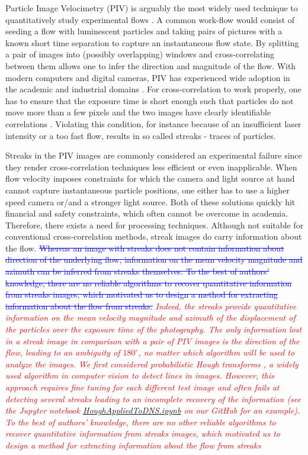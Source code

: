 \documentclass{svjour3}                     %
\newcommand{\new}[1]{\textit{\textcolor{red}{#1}}}
\newcommand{\old}[1]{\textcolor{blue}{\sout{#1}}}
\begin{document}
Particle Image Velocimetry (PIV) is arguably the most widely used technique to quantitatively study experimental flows \cite{westerweel1997fundamentals, raffel2018particle}. A common work-flow would consist of seeding a flow with luminescent particles and taking pairs of pictures with a known short time separation to capture an instantaneous flow state. By splitting a pair of images into (possibly overlapping) windows and cross-correlating between them allows one to infer the direction and magnitude of the flow. With modern computers and digital cameras, PIV has experienced wide adoption in the academic and industrial domains \cite{tropea2007springer}.
For cross-correlation to work properly, one has to ensure that the exposure time is short enough such that particles do not move more than a few pixels and the two images have clearly identifiable correlations \cite{westerweel1997fundamentals}. Violating this condition, for instance because of an insufficient laser intensity or a too fast flow, results in so called streaks - traces of particles.

Streaks in the PIV images are commonly considered an experimental failure since they render cross-correlation techniques less efficient or even inapplicable. When flow velocity imposes constraints for which the camera and light source at hand cannot capture instantaneous particle positions, one either has to use a higher speed camera or/and a stronger light source. Both of these solutions quickly hit financial and safety constraints, which often cannot be overcome in academia. Therefore, there exists a need for processing techniques.
Although not suitable for conventional cross-correlation methods, streak images do carry information about the flow. \old{Whereas an image with streaks does not contain information about direction of the underlying flow, information on the mean velocity magnitude and azimuth can be inferred from streaks themselves. To the best of authors' knowledge, there are no reliable algorithms to recover quantitative information from streaks images, which motivated us to design a method for extracting information about the flow from streaks.} \new{Indeed, the streaks provide quantitative information on the mean velocity magnitude and azimuth of the displacement of the particles over the exposure time of the photography. The only information lost in a streak image in comparison with a pair of PIV images is the direction of the flow, leading to an ambiguity of $180^{\circ}$, no matter which algorithm will be used to analyze the images. We first considered probabilistic Hough transforms \citep{galamhos1999}, a widely used algorithm in computer vision to detect lines in images. However, this approach requires fine tuning for each different test image and often fails at detecting several streaks leading to an incomplete recovery of the information (see the Jupyter notebook \href{https://github.com/agrayver/streakcnn/blob/master/test_Hough_on_DNS_skimage.ipynb}{HoughAppliedToDNS.ipynb} on our GitHub for an example). To the best of authors' knowledge, there are no other reliable algorithms to recover quantitative information from streaks images, which motivated us to design a method for extracting information about the flow from streaks}
\end{document}
